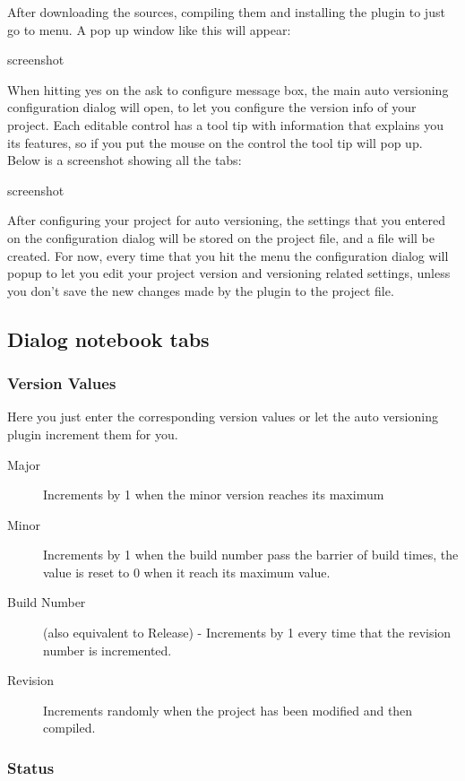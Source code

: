 After downloading the sources, compiling them and installing the plugin to \codeblocks just go to  menu. A pop up window like this will appear:

screenshot

When hitting yes on the ask to configure message box, the main auto versioning configuration dialog will open, to let you configure the version info of your project. Each editable control has a tool tip with information that explains you its features, so if you put the mouse on the control the tool tip will pop up. Below is a screenshot showing all the tabs:

screenshot

After configuring your project for auto versioning, the settings that you entered on the configuration dialog will be stored on the project file, and a  file will be created. For now, every time that you hit the  menu the configuration dialog will popup to let you edit your project version and versioning related settings, unless you don't save the new changes made by the plugin to the project file.

\subsection{Dialog notebook tabs}
\subsubsection{Version Values}

Here you just enter the corresponding version values or let the auto versioning plugin increment them for you.

\begin{description}
\item[Major] Increments by 1 when the minor version reaches its maximum
\item[Minor] Increments by 1 when the build number pass the barrier of build times, the value is reset to 0 when it reach its maximum value.
\item[Build Number] (also equivalent to Release) - Increments by 1 every time that the revision number is incremented.
\item[Revision] Increments randomly when the project has been modified and then compiled.
\end{description}

\subsubsection{Status}

